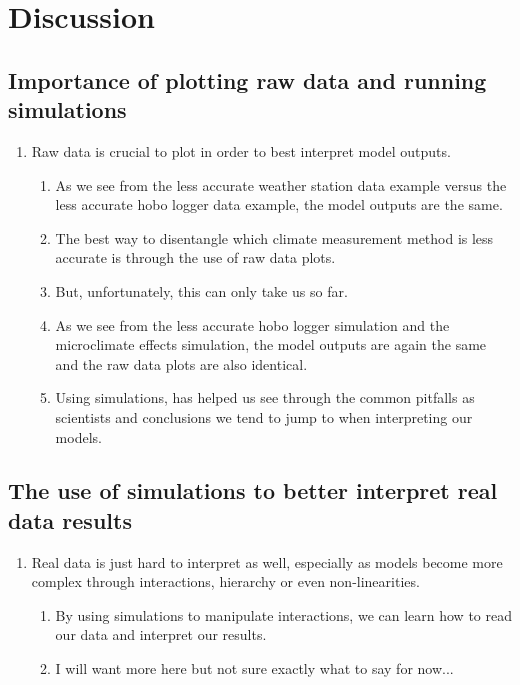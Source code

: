 \documentclass{article}\usepackage[]{graphicx}\usepackage[]{color}
\begin{document}
\section*{Discussion} 
\subsection*{Importance of plotting raw data and running simulations}
\begin{enumerate}
\item Raw data is crucial to plot in order to best interpret model outputs.
  \begin{enumerate}
  \item As we see from the less accurate weather station data example versus the less accurate hobo logger data example, the model outputs are the same.
  \item The best way to disentangle which climate measurement method is less accurate is through the use of raw data plots.
  \item But, unfortunately, this can only take us so far. 
  \item As we see from the less accurate hobo logger simulation and the microclimate effects simulation, the model outputs are again the same and the raw data plots are also identical. 
  \item Using simulations, has helped us see through the common pitfalls as scientists and conclusions we tend to jump to when interpreting our models. 
  \end{enumerate}
\end{enumerate}

\subsection*{The use of simulations to better interpret real data results}
\begin{enumerate}
\item Real data is just hard to interpret as well, especially as models become more complex through interactions, hierarchy or even non-linearities. 
  \begin{enumerate}
  \item By using simulations to manipulate interactions, we can learn how to read our data and interpret our results.
  \item I will want more here but not sure exactly what to say for now...
  \end{enumerate}
\end{enumerate}
\end{document}
